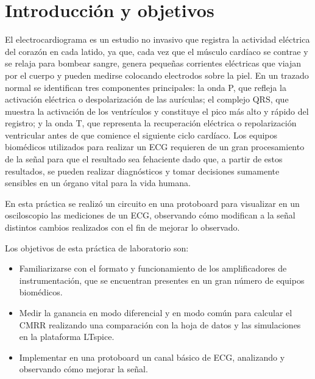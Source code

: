 \documentclass[10pt]{article}
\begin{document}
\thispagestyle{fancy}

\newpage
\tableofcontents
\thispagestyle{fancy}
\newpage

\section{Introducción y objetivos}

El electrocardiograma es un estudio no invasivo que registra la actividad eléctrica del corazón en cada latido, ya que, cada vez que el músculo cardíaco se contrae y se relaja para bombear sangre, genera pequeñas corrientes eléctricas que viajan por el cuerpo y pueden medirse colocando electrodos sobre la piel. En un trazado normal se identifican tres componentes principales: la onda P, que refleja la activación eléctrica o despolarización de las aurículas; el complejo QRS, que muestra la activación de los ventrículos y constituye el pico más alto y rápido del registro; y la onda T, que representa la recuperación eléctrica o repolarización ventricular antes de que comience el siguiente ciclo cardíaco. Los equipos biomédicos utilizados para realizar un ECG requieren de un gran procesamiento de la señal para que el resultado sea fehaciente dado que, a partir de estos resultados, se pueden realizar diagnósticos y tomar decisiones sumamente sensibles en un órgano vital para la vida humana.

\vspace{0.3cm}

En esta práctica se realizó un circuito en una protoboard para visualizar en un osciloscopio las mediciones de un ECG, observando cómo modifican a la señal distintos cambios realizados con el fin de mejorar lo observado.

\vspace{0.3cm}

Los objetivos de esta práctica de laboratorio son:

\begin{itemize}
    \item Familiarizarse con el formato y funcionamiento de los amplificadores de instrumentación, que se encuentran presentes en un gran número de equipos biomédicos.
    \item Medir la ganancia en modo diferencial y en modo común para calcular el CMRR realizando una comparación con la hoja de datos y las simulaciones en la plataforma LTspice.
    \item Implementar en una protoboard un canal básico de ECG, analizando y observando cómo mejorar la señal.
\end{itemize}
\end{document}
